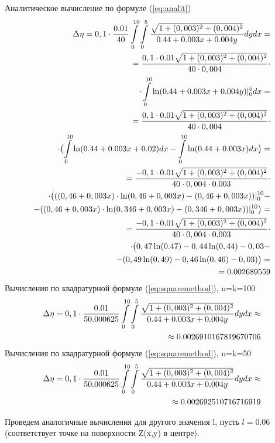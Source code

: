 \documentclass{article}
\begin{document}
Аналитическое вычисление по формуле (\ref{eq:analit})
\begin{align} \label{eq:analit1:min}
\Delta \eta = 0,1 \cdot \frac{0.01}{40} \int\limits_0^{10} \int\limits_0^5 \frac{\sqrt{1+(0,003)^2+(0,004)^2}}{0.44 + 0.003x + 0.004y} dy dx = \notag \\
= \frac{0,1 \cdot 0.01\sqrt{1+(0,003)^2+(0,004)^2}}{40 \cdot 0,004} \cdot \notag \\
\cdot \int\limits_0^{10} \ln(0.44 + 0.003x + 0.004y)|_0^5 dx = \notag \\
= \frac{0,1 \cdot 0.01\sqrt{1+(0,003)^2+(0,004)^2}}{40 \cdot 0,004} \cdot \notag \\
\cdot \bigl(\int\limits_0^{10} \ln(0.44 + 0.003x + 0.02)dx - \int\limits_0^{10} \ln(0.44 + 0.003x)dx \bigr) = \notag \\
= \frac{-0,1 \cdot 0.01\sqrt{1+(0,003)^2+(0,004)^2}}{40 \cdot 0,004 \cdot 0.003} \cdot \notag \\
\cdot \bigl(((0,46+0,003x) \cdot \ln(0,46+0,003x) - (0,46+0,003x))|_0^{10} - \notag \\
- ((0,46+0,003x) \cdot \ln(0,346+0,003x) - (0,346+0,003x))|_0^{10}\bigr) = \notag \\
= \frac{-0,1 \cdot 0.01\sqrt{1+(0,003)^2+(0,004)^2}}{40 \cdot 0,004 \cdot 0.003} \cdot \notag \\
\cdot \bigl(0,47 \ln(0.47)-0,44 \ln(0,44)-0,03- \notag \\
- (0,49 \ln(0,49)-0,46 \ln(0,46)-0,03)\bigr) = \notag \\
= 0.002689559
\end{align}
Вычисления по квадратурной формуле (\ref{eq:squaremethod}), n=k=100
\begin{align}\label{eq:sq1min10}
\Delta \eta = 0,1 \cdot \frac{0.01}{50.000625} \int\limits_0^{10} \int\limits_0^5 \frac{\sqrt{1+(0,003)^2+(0,004)^2}}{0.44 + 0.003x + 0.004y} dy dx \approx \notag \\ \approx 0.0026910167819670706
\end{align}
Вычисления по квадратурной формуле (\ref{eq:squaremethod}), n=k=50
\begin{align}\label{eq:sq1min5}
\Delta \eta = 0,1 \cdot \frac{0.01}{50.000625} \int\limits_0^{10} \int\limits_0^5 \frac{\sqrt{1+(0,003)^2+(0,004)^2}}{0.44 + 0.003x + 0.004y} dy dx \approx \notag \\ \approx 0.002692510716716919
\end{align}

Проведем аналогичные вычисления для другого значения l, пусть $l=0.06$ (соответствует точке на поверхности Z(x,y) в центре). %
\end{document}
